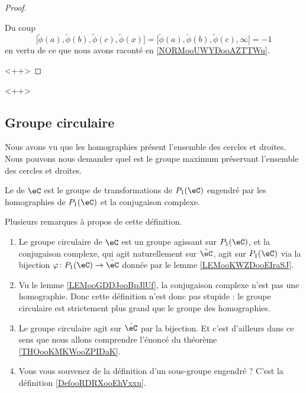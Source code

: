 \begin{proof}
\begin{subproof}
            Du coup
            \begin{equation}
                \big[ \tilde \phi(a),\tilde \phi(b), \tilde \phi(c),\tilde \phi(x) \big]=\big[ \tilde \phi(a),\tilde \phi(b), \tilde \phi(c), \infty \big]=-1
            \end{equation}
            en vertu de ce que nous avons raconté en \ref{NORMooUWYDooAZTTWu}.
            




    \end{subproof}
    <++>
\end{proof}
<++>

\subsection{Groupe circulaire}

Nous avons vu que les homographies présent l'ensemble des cercles et droites. Nous pouvons nous demander quel est le groupe maximum préservant l'ensemble des cercles et droites.

\begin{definition}
    Le  de \( \eC\) est le groupe de transformations de \( P_1(\eC)\) engendré par les homographies de \( P_1(\eC)\) et la conjugaison complexe.
\end{definition}

Plusieurs remarques à propos de cette définition.
\begin{enumerate}
    \item
        Le groupe circulaire de \( \eC\) est un groupe agissant sur \( P_1(\eC)\), et la conjugaison complexe, qui agit naturellement sur \( \hat\eC\), agit sur \( P_1(\eC)\) via la bijection \( \varphi\colon P_1(\eC)\to \hat \eC\) donnée par le lemme \ref{LEMooKWZDooEIraSJ}.
    \item
        Vu le lemme \ref{LEMooGDDJooBpJlUf}, la conjugaison complexe n'est pas une homographie. Donc cette définition n'est donc pas stupide : le groupe circulaire est strictement plus grand que le groupe des homographies.
    \item
        Le groupe circulaire agit sur \( \hat\eC\) par la bijection. Et c'est d'ailleurs dans ce sens que nous allons comprendre l'énoncé du théorème \ref{THOooKMKWooZPIDaK}.
    \item
        Vous vous souvenez de la définition d'un sous-groupe engendré ? C'est la définition \ref{DefooRDRXooEhVxxu}.
\end{enumerate}

